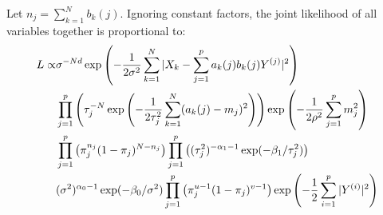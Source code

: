 Let $n_j = \sum_{k=1}^N b_k(j)$. Ignoring constant factors, the joint likelihood of all variables together is proportional to:
\begin{align*}
L \propto& \sigma^{-Nd}\exp\left(-\frac{1}{2\sigma^2} \sum_{k=1}^N |X_k  - \sum_{j=1}^p a_k(j) b_k(j) Y^{(j)}|^2\right) \\
& \prod_{j=1}^p \left(\tau_j^{-N}\exp\left(-\frac{1}{2\tau_j^2} \sum_{k=1}^N (a_k(j)-m_j)^2\right)\right) 
\exp\left(-\frac{1}{2\rho^2} \sum_{j=1}^p m_j^2\right)\\
& \prod_{j=1}^p \left(\pi_j^{n_j} (1-\pi_j)^{N-n_j}\right)
\prod_{j=1}^p \left((\tau^2_j)^{-\alpha_1-1} \exp(-\beta_1/\tau_j^2) \right)\\
&(\sigma^2)^{\alpha_0-1} \exp(-\beta_0/\sigma^2)  \prod_{j=1}^p \left(\pi_j^{u-1} (1-\pi_j)^{v-1}\right)  \exp\left(- \frac12 \sum_{i=1}^p |Y^{(i)}|^2\right)
\end{align*}

